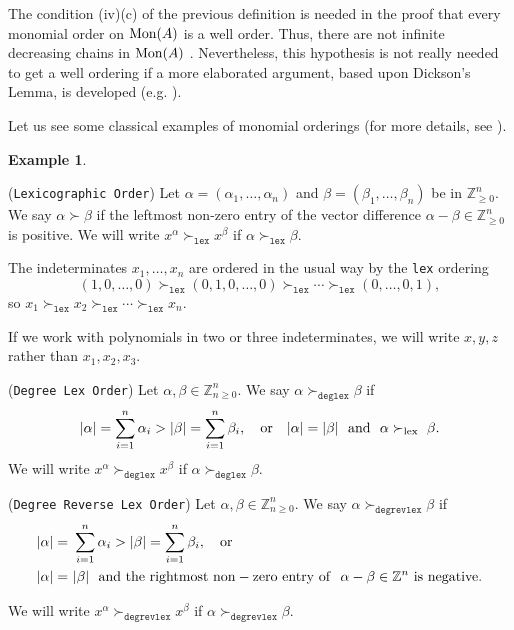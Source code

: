 \documentclass{amsart}
\theoremstyle{definition}
\newtheorem{example}[theorem]{Example}
\theoremstyle{remark}
\numberwithin{equation}{section}
\begin{document}
The condition (iv)(c) of the previous definition is needed in the proof that every monomial order on ${\rm Mon}(A)$ is a well order. Thus, there are not infinite decreasing chains in ${\rm Mon}(A)$ \cite[Proposition 12]{GallegoLezama2010}. Nevertheless, this hypothesis is not really needed to get a well ordering if a more elaborated argument, based upon Dickson's Lemma, is developed (e.g. \cite[Theorem 4.6.2]{BeckerWeispfenning1993}). 

Let us see some classical examples of monomial orderings (for more details, see \cite[Chapter 2, Section 2]{CoxLittleOshea2015}).

\begin{example}\label{Monomialordersexamples}
\item [\rm (i)] (\texttt{Lexicographic Order}) Let $\alpha = (\alpha_1, \dotsc, \alpha_n)$ and $\beta = (\beta_1, \dotsc, \beta_n)$ be in $\mathbb{Z}_{\ge 0}^{n}$. We say $\alpha \succ \beta$ if the leftmost non-zero entry of the vector difference $\alpha - \beta \in \mathbb{Z}_{\ge 0}^{n}$ is positive. We will write $x^{\alpha} \succ_{\texttt{lex}} x^{\beta}$ if $\alpha \succ_{\texttt{lex}} \beta$.

The indeterminates $x_1, \dotsc, x_n$ are ordered in the usual way by the \texttt{lex} ordering
\[
(1, 0, \dotsc, 0) \succ_{\texttt{lex}} (0, 1, 0, \dotsc, 0) \succ_{\texttt{lex}} \dotsb \succ_{\texttt{lex}} (0, \dotsc, 0, 1),
\]
so $x_1 \succ_{\texttt{lex}} x_2 \succ_{\texttt{lex}} \dotsb \succ_{\texttt{lex}} x_n$.

If we work with polynomials in two or three indeterminates, we will write $x, y, z$ rather than $x_1, x_2, x_3$.

\item [\rm (ii)] (\texttt{Degree Lex Order}) Let $\alpha, \beta \in \mathbb{Z}_{n\ge 0}^n$. We say $\alpha \succ_{\texttt{deglex}} \beta$ if
\[
|\alpha| = \sum_{i = 1}^{n} \alpha_i > |\beta| = \sum_{i=1}^{n} \beta_i, \quad {\rm or}\quad  |\alpha| = |\beta|\ \ {\rm and}\ \ \alpha\succ_{\rm lex}\ \beta.
\]
We will write $x^{\alpha} \succ_{\texttt{deglex}} x^{\beta}$ if $\alpha \succ_{\texttt{deglex}} \beta$.

\item [\rm (iii)] (\texttt{Degree Reverse Lex Order}) Let $\alpha, \beta \in \mathbb{Z}_{n\ge 0}^n$. We say $\alpha \succ_{\texttt{degrevlex}} \beta$ if
\begin{align*}
 |\alpha| = &\ \sum_{i = 1}^{n} \alpha_i > |\beta| = \sum_{i=1}^{n} \beta_i, \quad {\rm or} \\
 |\alpha| = &\ |\beta|\ \ {\rm and\ the\ rightmost\ non}-{\rm zero\ entry\ of}\ \ \alpha - \beta \in \mathbb{Z}^n\ {\rm is\ negative}.
\end{align*}

We will write $x^{\alpha} \succ_{\texttt{degrevlex}} x^{\beta}$ if $\alpha \succ_{\texttt{degrevlex}} \beta$.
\end{example}
\end{document}
